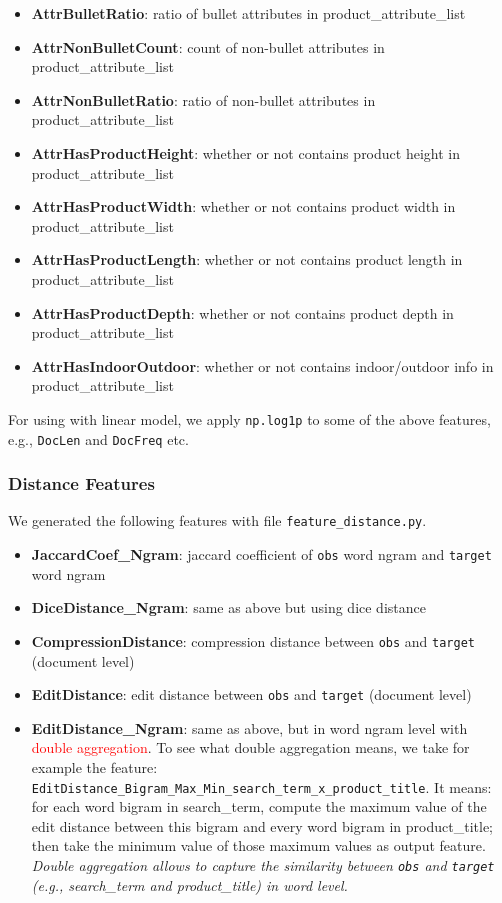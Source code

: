 \documentclass[12pt]{article}
\begin{document}
{{\begin{itemize}
\item \textbf{AttrBulletRatio}: ratio of bullet attributes in product\_attribute\_list
\item \textbf{AttrNonBulletCount}: count of non-bullet attributes in product\_attribute\_list
\item \textbf{AttrNonBulletRatio}: ratio of non-bullet attributes in product\_attribute\_list
\item \textbf{AttrHasProductHeight}: whether or not contains product height in product\_attribute\_list
\item \textbf{AttrHasProductWidth}: whether or not contains product width in product\_attribute\_list
\item \textbf{AttrHasProductLength}: whether or not contains product length in product\_attribute\_list
\item \textbf{AttrHasProductDepth}: whether or not contains product depth in product\_attribute\_list
\item \textbf{AttrHasIndoorOutdoor}: whether or not contains indoor/outdoor info in product\_attribute\_list
\end{itemize}

For using with linear model, we apply \texttt{np.log1p} to some of the above features, e.g., \texttt{DocLen} and \texttt{DocFreq} etc.

\subsubsection{Distance Features}
\label{subsec:Distance_Features}
We generated the following features with file \texttt{feature\_distance.py}.
\begin{itemize}
\item \textbf{JaccardCoef\_Ngram}: jaccard coefficient of \texttt{obs} word ngram and \texttt{target} word ngram
\item \textbf{DiceDistance\_Ngram}: same as above but using dice distance
\item \textbf{CompressionDistance}: compression distance between \texttt{obs} and \texttt{target} (document level)
\item \textbf{EditDistance}: edit distance between \texttt{obs} and \texttt{target} (document level)
\item \textbf{EditDistance\_Ngram}: same as above, but in word ngram level with \textcolor{red}{double aggregation}. To see what double aggregation means, we take for example the feature:  \texttt{EditDistance\_Bigram\_Max\_Min\_search\_term\_x\_product\_title}. It means: for each word bigram in search\_term, compute the maximum value of the edit distance between this bigram and every word bigram in product\_title; then take the minimum value of those maximum values as output feature. \emph{Double aggregation allows to capture the similarity between \texttt{obs} and \texttt{target} (e.g., search\_term and product\_title) in word level.}
\end{itemize}

}}
\end{document}
